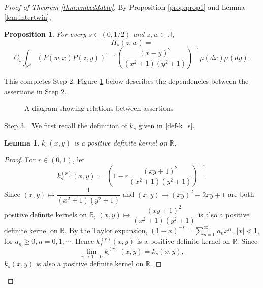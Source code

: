 \documentclass[journal]{IEEEtran}
\newtheorem{lemma}[theorem]{Lemma}
\newtheorem{proposition}[theorem]{Proposition}
\begin{document}
\begin{proof}[Proof of Theorem \ref{thm:embeddable}]
By Proposition \ref{prop:prop1} and Lemma \ref{lem:intertwin}, 

\begin{proposition}\label{prop:prop2}
For every $s \in (0,1/2)$ and $z, w \in \mathbb H$, 
\[ H_s (z,w) = \]
\[C_s \int_{\mathbb R^2} (P(w,x)P(z,y))^{1-s} \left( \frac{(x-y)^2}{(x^2 + 1) (y^2 + 1)} \right)^{-s} \mu(dx)\mu(dy). \] 
\end{proposition}

This completes Step 2. 
Figure \ref{fig:diagram} below describes the dependencies between the assertions in Step 2.\\ 

\begin{figure}
\begin{center}
\caption{A diagram showing relations between assertions}\label{fig:diagram}
\end{center}
\end{figure}

\vspace{1pc}


Step 3. \ We first recall the definition of $k_s$ given in \eqref{def-k_s}.  
 \begin{lemma}
 $k_s (x,y)$ is a positive definite kernel on $\mathbb R$. 
 \end{lemma}
 
 \begin{proof}
 For $r \in (0,1)$, let 
 \[ k^{(r)}_s (x,y) := \left(1-r \frac{(xy + 1)^2}{(x^2 + 1)(y^2 + 1)}\right)^{-s}. \]
 Since $(x,y) \mapsto \dfrac{1}{(x^2 + 1)(y^2 + 1)}$ and $(x,y) \mapsto (xy)^2 + 2xy + 1$ are both positive definite kernels on $\mathbb R$, 
 $(x,y) \mapsto \dfrac{(xy + 1)^2}{(x^2 + 1)(y^2 + 1)}$ is also a positive definite kernel on $\mathbb R$. 
 By the Taylor expansion, 
 $(1-x)^{-s} = \sum_{n=0}^{\infty} a_n x^n, \ |x| < 1$, 
 for $a_n \ge 0, n = 0,1, \cdots$. 
 Hence $ k^{(r)}_s (x,y)$ is a positive definite kernel on $\mathbb R$. 
 Since $$\lim_{r \to 1-0}  k^{(r)}_s (x,y) = k_s (x,y),$$
$ k_s (x,y)$ is also a positive definite kernel on $\mathbb R$. 
 \end{proof}


\end{proof}
\end{document}
